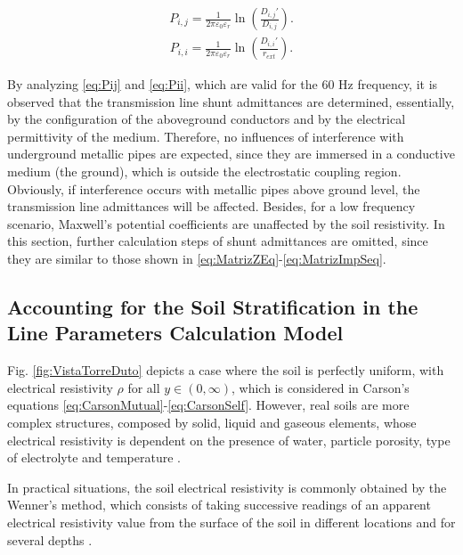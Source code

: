 \documentclass[conference]{IEEEtran}
\begin{document}
\begin{equation}\label{eq:Pij}
	\begin{aligned}
		P_{i,j}=\frac{1}{2\pi\varepsilon_{0}\varepsilon_{r}}\ln\left(\frac{D_{i,j}'}{D_{i,j}}\right).
	\end{aligned}
\end{equation}
\begin{equation}\label{eq:Pii}
	\begin{aligned}
		P_{i,i}=\frac{1}{2\pi\varepsilon_{0}\varepsilon_{r}}\ln\left(\frac{D_{i,i}'}{r_{ext}}\right).
	\end{aligned}
\end{equation}

By analyzing \eqref{eq:Pij} and \eqref{eq:Pii}, which are valid for the 60 Hz frequency, it is observed that the transmission line shunt admittances are determined, essentially, by the configuration of the aboveground conductors and by the electrical permittivity of the medium. Therefore, no influences of interference with underground metallic pipes are expected, since they are immersed in a conductive medium (the ground), which is outside the electrostatic coupling region. Obviously, if interference occurs with metallic pipes above ground level, the transmission line admittances will be affected. Besides, for a low frequency scenario, Maxwell's potential coefficients are unaffected by the soil resistivity. In this section, further calculation steps of shunt admittances are omitted, since they are similar to those shown in \eqref{eq:MatrizZEq}-\eqref{eq:MatrizImpSeq}.

\subsection{Accounting for the Soil Stratification in the Line Parameters Calculation Model}
Fig. \ref{fig:VistaTorreDuto} depicts a case where the soil is perfectly uniform, with electrical resistivity $\rho$ for all $y\in(0, \infty)$, which is considered in Carson's equations \eqref{eq:CarsonMutual}-\eqref{eq:CarsonSelf}. However, real soils are more complex structures, composed by solid, liquid and gaseous elements, whose electrical resistivity is dependent on the presence of water, particle porosity, type of electrolyte and temperature \cite{He2012}.


In practical situations, the soil electrical resistivity is commonly obtained by the Wenner's method, which consists of taking successive readings of an apparent electrical resistivity value from the surface of the soil in different locations and for several depths \cite{NBR7117}.
\end{document}

